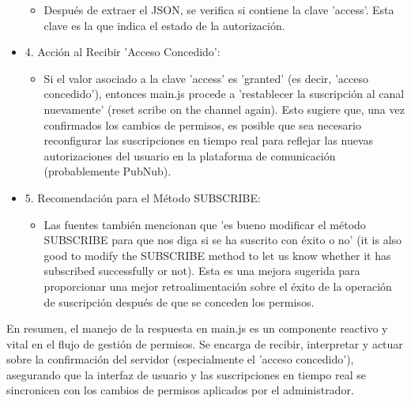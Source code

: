 \documentclass{report}
\begin{document}
\begin{itemize}
\begin{itemize}
            \item Después de extraer el JSON, se verifica si contiene la clave 'access'. Esta clave es la que indica el estado de la autorización.
        \end{itemize}
    \item 4. Acción al Recibir 'Acceso Concedido':
        \begin{itemize}
            \item Si el valor asociado a la clave 'access' es 'granted' (es decir, 'acceso concedido'), entonces main.js procede a 
            'restablecer la suscripción al canal nuevamente' (reset scribe on the channel again). Esto sugiere que, una vez confirmados 
            los cambios de permisos, es posible que sea necesario reconfigurar las suscripciones en tiempo real para reflejar las nuevas 
            autorizaciones del usuario en la plataforma de comunicación (probablemente PubNub).
        \end{itemize}
    \item 5. Recomendación para el Método SUBSCRIBE:
        \begin{itemize}
            \item Las fuentes también mencionan que 'es bueno modificar el método SUBSCRIBE para que nos diga si se ha suscrito con éxito o no' 
            (it is also good to modify the SUBSCRIBE method to let us know whether it has subscribed successfully or not). Esta es una mejora 
            sugerida para proporcionar una mejor retroalimentación sobre el éxito de la operación de suscripción después de que se conceden los permisos.
        \end{itemize}
\end{itemize}
En resumen, el manejo de la respuesta en main.js es un componente reactivo y vital en el flujo de gestión de permisos. Se encarga 
de recibir, interpretar y actuar sobre la confirmación del servidor (especialmente el 'acceso concedido'), asegurando que la 
interfaz de usuario y las suscripciones en tiempo real se sincronicen con los cambios de permisos aplicados por el administrador.
\end{document}
